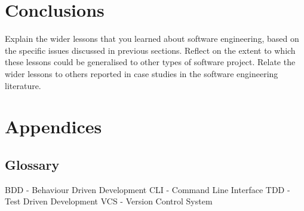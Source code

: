 \documentclass{l3proj}
\begin{document}
\newpage

\section{Conclusions}
\label{sec:conclusion}


Explain the wider lessons that you learned about software engineering,
based on the specific issues discussed in previous sections.  Reflect
on the extent to which these lessons could be generalised to other
types of software project.  Relate the wider lessons to others
reported in case studies in the software engineering literature.


\section{Appendices}
\label{sec:appendices}

\subsection{Glossary}
\label{subsec:appendices:glossary}
BDD - Behaviour Driven Development
CLI - Command Line Interface
TDD - Test Driven Development
VCS - Version Control System




\end{document}
